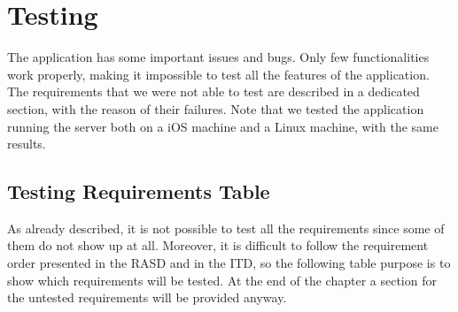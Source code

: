 \documentclass[../ATD.tex]{subfiles}
\begin{document}
    \chapter{Testing}\label{ch:testing}
    The application has some important issues and bugs.
    Only few functionalities work properly, making it impossible to test all the features of the application.
    The requirements that we were not able to test are described in a dedicated section, with the reason of their failures.
    Note that we tested the application running the server both on a iOS machine and a Linux machine, with the same results.

    \section{Testing Requirements Table}\label{sec:testing-requirements-table}
    As already described, it is not possible to test all the requirements since some of them do not show up at all.
    Moreover, it is difficult to follow the requirement order presented in the RASD and in the ITD, so the following table purpose is to show which requirements will be tested.
    At the end of the chapter a section for the untested requirements will be provided anyway.
\end{document}
